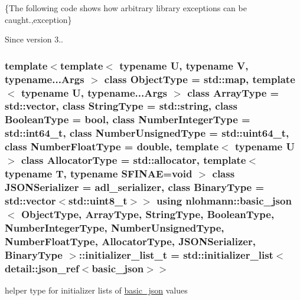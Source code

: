 \{The following code shows how arbitrary library exceptions can be caught.,exception\}

\begin{DoxySince}{Since}
version 3.. 
\end{DoxySince}
\subsubsection[{\texorpdfstring{initializer\+\_\+list\+\_\+t}{initializer_list_t}}]{\setlength{\rightskip}{0pt plus 5cm}template$<$template$<$ typename U, typename V, typename...\+Args $>$ class Object\+Type = std\+::map, template$<$ typename U, typename...\+Args $>$ class Array\+Type = std\+::vector, class String\+Type  = std\+::string, class Boolean\+Type  = bool, class Number\+Integer\+Type  = std\+::int64\+\_\+t, class Number\+Unsigned\+Type  = std\+::uint64\+\_\+t, class Number\+Float\+Type  = double, template$<$ typename U $>$ class Allocator\+Type = std\+::allocator, template$<$ typename T, typename S\+F\+I\+N\+A\+E=void $>$ class J\+S\+O\+N\+Serializer = adl\+\_\+serializer, class Binary\+Type  = std\+::vector$<$std\+::uint8\+\_\+t$>$$>$ using {\bf nlohmann\+::basic\+\_\+json}$<$ Object\+Type, Array\+Type, String\+Type, Boolean\+Type, Number\+Integer\+Type, Number\+Unsigned\+Type, Number\+Float\+Type, Allocator\+Type, J\+S\+O\+N\+Serializer, Binary\+Type $>$\+::{\bf initializer\+\_\+list\+\_\+t} =  std\+::initializer\+\_\+list$<${\bf detail\+::json\+\_\+ref}$<${\bf basic\+\_\+json}$>$$>$}\hypertarget{classnlohmann_1_1basic__json_a4d392f594e4c32345d47c2a175aad5c8}{}\label{classnlohmann_1_1basic__json_a4d392f594e4c32345d47c2a175aad5c8}


helper type for initializer lists of \hyperlink{classnlohmann_1_1basic__json}{basic\+\_\+json} values 

